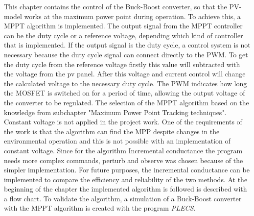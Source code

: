 This chapter contains the control of the Buck-Boost converter, so that the PV-model works at the maximum power point during operation. To achieve this, a MPPT algorithm is implemented. The output signal from the MPPT controller can be the duty cycle or a reference voltage, depending which kind of controller that is implemented. If the output signal is the duty cycle, a control system is not necessary because the duty cycle signal can connect directly to the PWM. To get the duty cycle from the reference voltage firstly this value will subtracted with the voltage from the pv panel. After this voltage and current control will change the calculated voltage to the necessary duty cycle. The PWM indicates how long the MOSFET is switched on for a period of time, allowing the output voltage of the converter to be regulated.
The selection of the MPPT algorithm based on the knowledge from subchapter "Maximum Power Point Tracking techniques".
Constant voltage is not applied in the project work. One of the requirements of the work is that the algorithm can find the MPP despite changes in the environmental operation and this is not possible with an implementation of constant voltage. Since for the algorithm Incremental conductance the program needs more complex commands, perturb and observe was chosen because of the simpler implementation. For future purposes, the incremental conductance can be implemented to compare the efficiency and reliability of the two methods.
At the beginning of the chapter the implemented algorithm is followed is described with a flow chart. To validate the algorithm, a simulation of a Buck-Boost converter with the MPPT algorithm is created with the program \textit{PLECS}.
